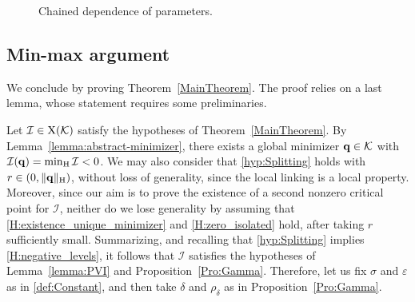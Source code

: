 \documentclass{article}
\newcommand{\boK}{\mathcal{K}}
\newcommand{\boI}{\mathcal{I}}
\newcommand{\Hilb}{{\textnormal H}}
\newcommand{\minq}{{\bf q}}
\newcommand{\X}{{\textnormal X}}
\theoremstyle{definition}
\begin{document}
\begin{figure}[ht]
\centering
{}
\caption{Chained dependence of parameters.}
\label{fig:param-chain}
\end{figure}
\subsection{Min-max argument}\label{sect:min-max}

We conclude by proving Theorem~\ref{MainTheorem}. The proof relies on a last lemma, whose statement requires some preliminaries. 

Let $\boI\in\X(\boK)$ satisfy the hypotheses of Theorem~\ref{MainTheorem}. By Lemma~\ref{lemma:abstract-minimizer}, there exists a global minimizer $\minq\in\boK$ with $\boI(\minq)=\min_{\Hilb}\boI<0$. We may also consider that \eqref{hyp:Splitting}  holds with $r\in(0,\|\minq\|_\Hilb)$, without loss of generality, since the local linking is a local property. Moreover, since our aim is to prove the existence of a second nonzero critical point for $\boI$, neither do we lose generality by assuming that \eqref{H:existence_unique_minimizer} and \eqref{H:zero_isolated} hold, after taking $r$ sufficiently small. Summarizing, and recalling that \eqref{hyp:Splitting} implies \eqref{H:negative_levels}, it follows that $\boI$ satisfies the hypotheses of Lemma~\ref{lemma:PVI} and Proposition~\ref{Pro:Gamma}. Therefore, let us fix $\sigma$ and $\varepsilon$ as in \eqref{def:Constant}, and then take $\delta$ and $\rho_\delta$ as in Proposition~\ref{Pro:Gamma}.
\end{document}
